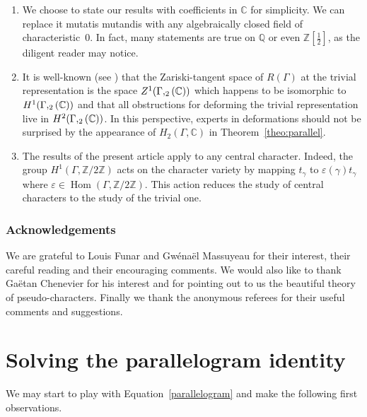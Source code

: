 \documentclass[JEP,XML,SOM,Unicode,NoEqCountersInSection]{cedram}
\newcommand{\NoChangel}[1]{%
\expandafter\let\csname old\string#1\endcsname=#1
\let#1=\relax
\newcommand{#1}{\mathcode`l="716C\csname old\string#1\endcsname\mathcode`l="7160 }%
}
\theoremstyle{definition}
\newcommand{\ZZ}{\mathbb{Z}}
\newcommand{\QQ}{\mathbb{Q}}
\newcommand{\CC}{\mathbb{C}}
\newcommand{\petitsl}{\mathrm{sl}}\NoChangel{\petitsl}
\newcommand{\Hom}{\operatorname{Hom}}
\begin{document}

\begin{enumerate}
\item
We choose to state our results with coefficients in $\CC$ for
simplicity. We can replace it mutatis mutandis with any
algebraically closed field of characteristic~0. In fact, many statements are
true on $\QQ$ or even $\ZZ[\frac{1}{2}]$, as the diligent reader may notice.

\item
It is well-known (see \eg \cite{Weil}) that the
Zariski-tangent space of $R(\Gamma)$ at the trivial representation is the
space $Z^1(\Gamma,\petitsl_2(\CC))$ which happens to be isomorphic
to $H^1(\Gamma,\petitsl_2(\CC))$ and that all obstructions for
deforming the trivial representation live in
$H^2(\Gamma, \petitsl_2(\CC))$.
In this perspective, experts in deformations should not be surprised by
the appearance of $H_2(\Gamma,\CC)$ in Theorem~\ref{theo:parallel}.

\item
The results of the present article apply to any central character.
Indeed, the group $H^1(\Gamma,\ZZ/2\ZZ)$ acts on the character variety by
mapping $t_\gamma$ to $\varepsilon(\gamma)t_\gamma$ where
$\varepsilon\in \Hom(\Gamma,\ZZ/2\ZZ)$. This action reduces the study of
central characters to the study of the trivial one.
\end{enumerate}

\subsubsection*{Acknowledgements}
We are grateful to Louis Funar and Gwénaël Massuyeau for their interest,
their careful reading and their encouraging comments. We would also like to
thank Gaëtan Chenevier for his interest and for pointing out to us the
beautiful theory of pseudo-characters.
Finally we thank the anonymous
referees for their useful comments and suggestions.

\section{Solving the parallelogram identity}

We may start to play with Equation~\eqref{parallelogram} and make the
following first observations.
\end{document}
